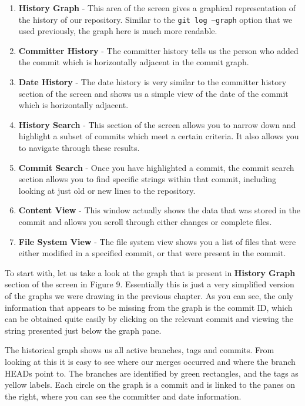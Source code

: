 \begin{enumerate}
\item \textbf{History Graph} - This area of the screen gives a graphical representation of the history of our repository.
Similar to the \texttt{git log --graph} option that we used previously, the graph here is much more readable.
\item \textbf{Committer History} - The committer history tells us the person who added the commit which is horizontally adjacent in the commit graph.
\item \textbf{Date History} - The date history is very similar to the committer history section of the screen and shows us a simple view of the date of the commit which is horizontally adjacent.
\item \textbf{History Search} - This section of the screen allows you to narrow down and highlight a subset of commits which meet a certain criteria.
It also allows you to navigate through these results.
\item \textbf{Commit Search} - Once you have highlighted a commit, the commit search section allows you to find specific strings within that commit, including looking at just old or new lines to the repository.
\item \textbf{Content View} - This window actually shows the data that was stored in the commit and allows you scroll through either changes or complete files.
\item \textbf{File System View} - The file system view shows you a list of files that were either modified in a specified commit, or that were present in the commit.
\end{enumerate}

To start with, let us take a look at the graph that is present in \textbf{History Graph} section of the screen in Figure 9.
Essentially this is just a very simplified version of the graphs we were drawing in the previous chapter.
As you can see, the only information that appears to be missing from the graph is the commit ID, which can be obtained quite easily by clicking on the relevant commit and viewing the string presented just below the graph pane.


The historical graph shows us all active branches, tags and commits.
From looking at this it is easy to see where our merges occurred and where the branch HEADs point to.
The branches are identified by green rectangles, and the tags as yellow labels.
Each circle on the graph is a commit and is linked to the panes on the right, where you can see the committer and date information.

